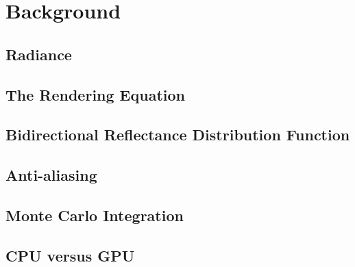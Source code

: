 \chapter{Background}

\section{Radiance}

\section{The Rendering Equation}

\section{Bidirectional Reflectance Distribution Function}

\section{Anti-aliasing}

\section{Monte Carlo Integration}

\section{CPU versus GPU}

